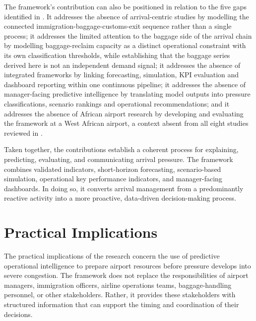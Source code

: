 The framework's contribution can also be positioned in relation to the five gaps identified in . It addresses the absence of arrival-centric studies by modelling the connected immigration-baggage-customs-exit sequence rather than a single process; it addresses the limited attention to the baggage side of the arrival chain by modelling baggage-reclaim capacity as a distinct operational constraint with its own classification thresholds, while establishing that the baggage series derived here is not an independent demand signal; it addresses the absence of integrated frameworks by linking forecasting, simulation, KPI evaluation and dashboard reporting within one continuous pipeline; it addresses the absence of manager-facing predictive intelligence by translating model outputs into pressure classifications, scenario rankings and operational recommendations; and it addresses the absence of African airport research by developing and evaluating the framework at a West African airport, a context absent from all eight studies reviewed in .

Taken together, the contributions establish a coherent process for explaining, predicting, evaluating, and communicating arrival pressure. The framework combines validated indicators, short-horizon forecasting, scenario-based simulation, operational key performance indicators, and manager-facing dashboards. In doing so, it converts arrival management from a predominantly reactive activity into a more proactive, data-driven decision-making process.

\section{Practical Implications}
\label{sec:practical-implications}

The practical implications of the research concern the use of predictive operational intelligence to prepare airport resources before pressure develops into severe congestion. The framework does not replace the responsibilities of airport managers, immigration officers, airline operations teams, baggage-handling personnel, or other stakeholders. Rather, it provides these stakeholders with structured information that can support the timing and coordination of their decisions.


